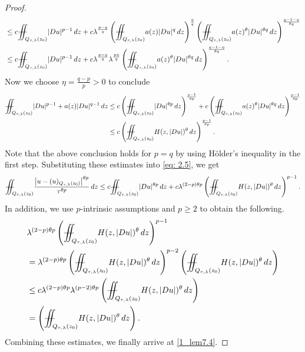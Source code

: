 \documentclass[notitlepage,11pt,reqno]{amsart}
\theoremstyle{definition}
\numberwithin{equation}{section}
\newcommand{\iintss}{{\int\hspace{-0.28cm}\int}}
\newcommand{ \miints }{{\iintss\hspace{-0.56cm} -\hspace{-0.15cm}-}}
\newcommand{\miint}[1]{{\miints_{\hspace{-0.13cm}#1}}}
\begin{document}
\begin{proof}
\begin{align*}
  &\leq c \miint{Q_{\tau, \lambda}(z_0)}|Du|^{p-1}\, dz+c\lambda^{\frac{p-q}{q}}\left(\miint{Q_{\tau, \lambda}(z_0)}a(z)|Du|^{q}\, dz\right)^{\frac{\eta}{q}}\left(\miint{Q_{\tau, \lambda}(z_0)}a(z)^{\theta}|Du|^{\theta q}\, dz\right)^{\frac{q-1-\eta}{\theta q}}\\
&\leq c \miint{Q_{\tau, \lambda}(z_0)}|Du|^{p-1}\, dz+ c\lambda^{\frac{p-q}{q}}\lambda^{\frac{p\eta}{q}}\left(\miint{Q_{\tau, \lambda}(z_0)}a(z)^{\theta}|Du|^{\theta q}\, dz\right)^{\frac{q-1-\eta}{\theta q}}.
 \end{align*}
 Now we choose $\eta=\frac{q-p}{p}>0$ to conclude
 \begin{align*}
 \miint{Q_{\tau, \lambda}(z_0)}|Du|^{p-1}+a(z)|Du|^{q-1}\, dz &\leq c \left(\miint{Q_{\tau, \lambda}(z_0)}|Du|^{\theta p}\, dz\right)^{\frac{p-1}{\theta p}}+ c\left(\miint{Q_{\tau, \lambda}(z_0)}a(z)^{\theta}|Du|^{\theta q}\, dz\right)^{\frac{p-1}{\theta p}}\\
 &\leq c \left(\miint{Q_{\tau, \lambda}(z_0)} H(z, |Du|)^{\theta}\, dz\right)^{\frac{p-1}{\theta p}}.   
 \end{align*}
 Note that the above conclusion holds for $p=q$ by using H\"{o}lder's inequality in the first step. Substituting these estimates into \eqref{eq: 2.5}, we get
 \begin{align*}  
 \miint{Q_{\tau, \lambda}(z_0)}\frac{\left|u-(u)_{Q_{\tau, \lambda}(z_0)}\right|^{\theta p}}{\tau^{\theta p}}\, dz \leq c \miint{Q_{\tau, \lambda}(z_0)}|Du|^{\theta p}\, dz + c \lambda^{(2-p)\theta p}\left(\miint{Q_{\tau, \lambda}(z_0)}H(z, |Du|)^{\theta
 }\, dz\right)^{p-1}.
 \end{align*}
 In addition, we use $p$-intrinsic assumptions and $p\geq 2$ to obtain the following.
 \begin{align*}
   &\lambda^{(2-p)\theta p}\left(\miint{Q_{\tau, \lambda}(z_0)}H(z, |Du|)^{\theta}\, dz\right)^{p-1}\\
   &= \lambda^{(2-p)\theta p}\left(\miint{Q_{\tau, \lambda}(z_0)}H(z, |Du|)^{\theta}\, dz\right)^{p-2}\left(\miint{Q_{\tau, \lambda}(z_0)}H(z, |Du|)^{\theta}\, dz\right)\\
   &\leq c \lambda^{(2-p)\theta p}\lambda^{(p-2)\theta p}\left(\miint{Q_{\tau, \lambda}(z_0)}H(z,|Du|)^{\theta}\, dz\right)\\
   &= \left(\miint{Q_{\tau, \lambda}(z_0)}H(z, |Du|)^{\theta}\, dz\right).
 \end{align*}
 Combining these estimates, we finally arrive at \eqref{1_lem7.4}. 
\end{proof}
\end{document}
